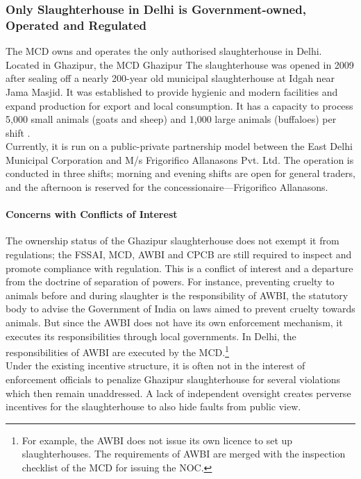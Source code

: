 \documentclass[a4paper, 12pt, twoside]{article}
\begin{document}
\subsubsection{Only Slaughterhouse in Delhi is Government-owned, Operated and Regulated}

The MCD owns and operates the only authorised slaughterhouse in Delhi. Located in Ghazipur, the MCD Ghazipur The slaughterhouse was opened in 2009 after sealing off a nearly 200-year old municipal slaughterhouse at Idgah near Jama Masjid. It was established to provide hygienic and modern facilities and expand production for export and local consumption. It has a capacity to process 5,000 small animals (goats and sheep) and 1,000 large animals (buffaloes) per shift \parencite{bhardwajnews}.\\

Currently, it is run on a public-private partnership model between the East Delhi Municipal Corporation and M/s Frigorifico Allanasons Pvt. Ltd. The operation is conducted in three shifts; morning and evening shifts are open for general traders, and the afternoon is reserved for the concessionaire—Frigorifico Allanasons.

\paragraph{Concerns with Conflicts of Interest}


The ownership status of the Ghazipur slaughterhouse does not exempt it from regulations; the FSSAI, MCD, AWBI and CPCB are still required to inspect and promote compliance with regulation. This is a conflict of interest and a departure from the doctrine of separation of powers. For instance, preventing cruelty to animals before and during slaughter is the responsibility of AWBI, the statutory body to advise the Government of India on laws aimed to prevent cruelty towards animals. But since the AWBI does not have its own enforcement mechanism, it executes its responsibilities through local governments. In Delhi, the responsibilities of AWBI are executed by the MCD.\footnote{ For example, the AWBI does not issue its own licence to set up slaughterhouses. The requirements of AWBI are merged with the inspection checklist of the MCD for issuing the NOC.}\\

Under the existing incentive structure, it is often not in the interest of enforcement officials to penalize Ghazipur slaughterhouse for several violations which then remain unaddressed. A lack of independent oversight creates perverse incentives for the slaughterhouse to also hide faults from public view. \\
\end{document}
